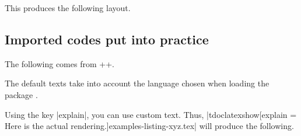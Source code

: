 

\begin{tdocexa}
    \leavevmode

    \begin{tdoclatex}[code]

    \end{tdoclatex}

    This produces the following layout.


\end{tdocexa}




\subsection{Imported codes put into practice} \label{tdoc-latexshow}

\begin{tdocexa}[Showcase]
    The following comes from \tdocinlatex++.

    \medskip

    \begin{tdoc-doc-showcase}

    \end{tdoc-doc-showcase}
\end{tdocexa}


\begin{tdocnote}
    The default texts take into account the language chosen when loading the package \thispack{}.
\end{tdocnote}




\begin{tdocexa}
    Using the key \tdocinlatex|explain|, you can use custom text. Thus, \tdocinlatex|tdoclatexshow[explain = Here is the actual rendering.]{examples-listing-xyz.tex}| will produce the following.

    \medskip

    \begin{tdoc-doc-showcase}

    \end{tdoc-doc-showcase}
\end{tdocexa}


